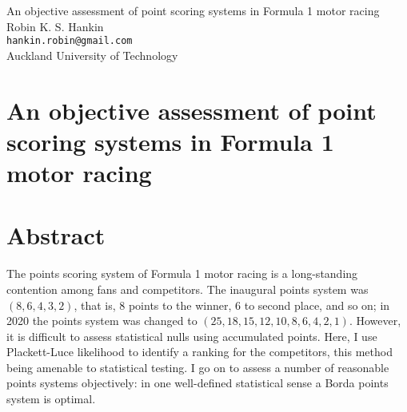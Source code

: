 \documentclass[a4,12pt]{article}
\begin{document}
\begin{titlepage}
  \begin{center}{\Large
      An objective assessment of point scoring systems in Formula 1 motor racing}\\
    Robin K. S. Hankin\\
{\tt hankin.robin@gmail.com}\\
Auckland University of Technology
\end{center}


\end{titlepage}

\newcommand{\raik}{R\"{a}ikk\"{o}nen}

\newpage
\section*{An objective assessment of point scoring systems in Formula 1 motor racing}
\section*{Abstract}

The points scoring system of Formula 1 motor racing is a long-standing
contention among fans and competitors.  The inaugural points system
was $(8,6,4,3,2)$, that is, 8 points to the winner, 6 to second place,
and so on; in 2020 the points system was changed to
$(25,18,15,12,10,8,6,4,2,1)$.  However, it is difficult to assess
statistical nulls using accumulated points.  Here, I use Plackett-Luce
likelihood to identify a ranking for the competitors, this method
being amenable to statistical testing.  I go on to assess a
number of reasonable points systems objectively: in one well-defined
statistical sense a Borda points system is optimal.
\end{document}
